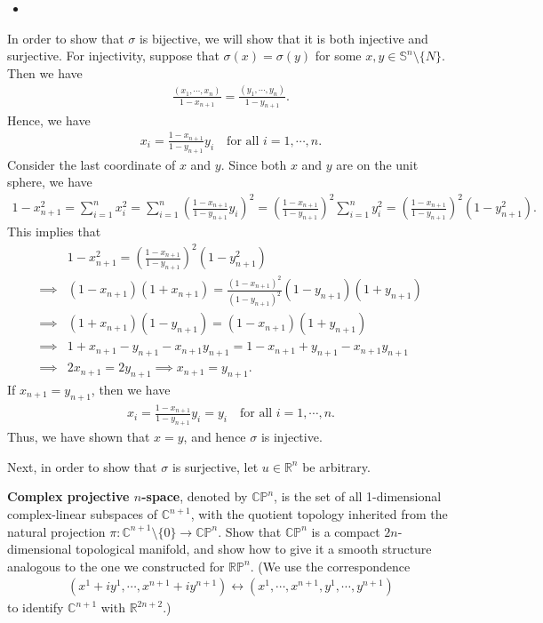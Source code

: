 \begin{itemize}
    \item [(b)] 
\end{itemize}
In order to show that $\sigma$ is bijective, we will show that it is both injective and surjective. For injectivity, suppose that $\sigma(x)=\sigma(y)$ for some $x,y\in \mathbb{S}^n\setminus \{N\}$. Then we have 
\begin{align}
    \frac{(x_1,\cdots,x_n)}{1-x_{n+1}}=\frac{(y_1,\cdots,y_n)}{1-y_{n+1}}.
\end{align}
Hence, we have 
\begin{align}
    x_i= \frac{1-x_{n+1}}{1-y_{n+1}}y_i\quad \text{for all } i=1,\cdots,n.
\end{align}
Consider the last coordinate of $x$ and $y$. Since both $x$ and $y$ are on the unit sphere, we have 
\begin{align}
    1-x_{n+1}^2=\sum_{i=1}^{n}x_i^2=\sum_{i=1}^{n}\left(\frac{1-x_{n+1}}{1-y_{n+1}}y_i\right)^2=\left(\frac{1-x_{n+1}}{1-y_{n+1}}\right)^2\sum_{i=1}^{n}y_i^2=\left(\frac{1-x_{n+1}}{1-y_{n+1}}\right)^2(1-y_{n+1}^2).
\end{align}
This implies that
\begin{align}
    &1-x_{n+1}^2=\left(\frac{1-x_{n+1}}{1-y_{n+1}}\right)^2(1-y_{n+1}^2)\\
    \implies &(1-x_{n+1})(1+x_{n+1})=\frac{(1-x_{n+1})^2}{(1-y_{n+1})^2}(1-y_{n+1})(1+y_{n+1})\\
    \implies &(1+x_{n+1})(1-y_{n+1})=(1-x_{n+1})(1+y_{n+1})\\
    \implies &1+x_{n+1}-y_{n+1}-x_{n+1}y_{n+1}=1-x_{n+1}+y_{n+1}-x_{n+1}y_{n+1}\\
    \implies &2x_{n+1}=2y_{n+1}\implies x_{n+1}=y_{n+1}.
\end{align}
If $x_{n+1}=y_{n+1}$, then we have
\begin{align}
    x_i= \frac{1-x_{n+1}}{1-y_{n+1}}y_i=y_i\quad \text{for all } i=1,\cdots,n.
\end{align}
Thus, we have shown that $x=y$, and hence $\sigma$ is injective.

Next, in order to show that $\sigma$ is surjective, let $u\in \mathbb{R}^n$ be arbitrary. 











\clearpage
{}
\textbf{Complex projective $n$-space}, denoted by $\mathbb{CP}^n$, is the set of all 1-dimensional complex-linear subspaces of $\mathbb{C}^{n+1}$, with the quotient topology inherited
from the natural projection $\pi:\mathbb{C}^{n+1}\setminus \{0\}\to \mathbb{CP}^n$. Show that $\mathbb{CP}^n$ is a
compact $2n$-dimensional topological manifold, and show how to give it a smooth structure analogous to the one we constructed for $\mathbb{RP}^n$. (We use the correspondence
\begin{align}
    (x^1+iy^1,\cdots,x^{n+1}+iy^{n+1}) \longleftrightarrow (x^1,\cdots,x^{n+1},y^1,\cdots,y^{n+1})
\end{align}
to identify $\mathbb{C}^{n+1}$ with $\mathbb{R}^{2n+2}$.)

\answer{}
